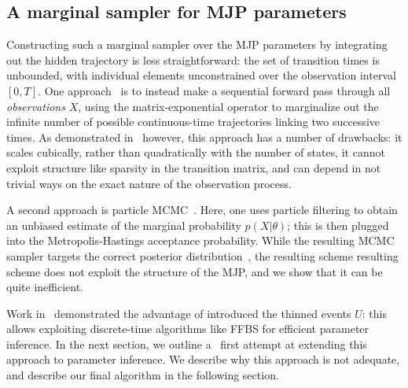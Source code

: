 \subsection{A marginal sampler for MJP parameters} 
Constructing such a marginal sampler over the MJP parameters by
integrating out the hidden trajectory is less straightforward:
the set of transition times is unbounded, with individual elements
unconstrained over the observation interval $[0,T]$.
One approach~\cite{FearnSher2006} is to instead make a sequential 
forward pass through all {\em observations} $X$, using the matrix-exponential
operator to marginalize out the infinite number of possible 
continuous-time trajectories linking two successive times. As
demonstrated in~\cite{RaoTeh13} however, this approach has a number of 
drawbacks: it scales cubically, rather than quadratically with the 
number of states, it cannot exploit structure like sparsity in the 
transition matrix, and can depend in not trivial ways on the exact 
nature of the observation process.


A second approach is particle MCMC~\cite{Andrieu10}. Here, one uses 
particle filtering to obtain an unbiased estimate of the marginal 
probability $p(X|\theta)$; this is then plugged into the 
Metropolis-Hastings acceptance probability. While the resulting MCMC 
sampler targets the correct posterior distribution~\cite{Andrieu09}, 
the resulting scheme resulting scheme does not exploit the structure 
of the MJP, and we show that it can be quite inefficient.

Work in~\cite{RaoTeh13, RaoTeh12} demonstrated the advantage of
introduced the thinned events $U$: this allows exploiting discrete-time 
algorithms like FFBS for efficient parameter inference.
In the next section, we outline a \naive\  first attempt at extending this 
approach to parameter inference.
We describe why this approach is not adequate, and describe our
final algorithm in the following section. 

